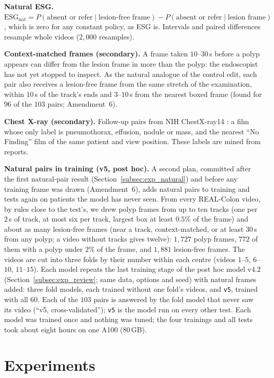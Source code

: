 \documentclass[5p,times,twocolumn,authoryear]{elsarticle}
\begin{document}
\textbf{Natural ESG.} $\text{ESG}_{\text{nat}} = P(\text{absent or refer} \mid \text{lesion-free frame}) - P(\text{absent or refer} \mid \text{lesion frame})$, which is zero for any constant policy, as ESG is. Intervals and paired differences resample whole videos ($2{,}000$ resamples).

\textbf{Context-matched frames (secondary).} A frame taken $10$--$30$\,s before a polyp appears can differ from the lesion frame in more than the polyp: the endoscopist has not yet stopped to inspect. As the natural analogue of the control edit, each pair also receives a lesion-free frame from the same stretch of the examination, within $10$\,s of the track's ends and $3$--$10$\,s from the nearest boxed frame (found for $96$ of the $103$ pairs; Amendment~6).

\textbf{Chest X-ray (secondary).} Follow-up pairs from NIH ChestX-ray14 \citep{wang2017chestx}: a film whose only label is pneumothorax, effusion, nodule or mass, and the nearest ``No Finding'' film of the same patient and view position. These labels are mined from reports.

\textbf{Natural pairs in training (v5, post hoc).} A second plan, committed after the first natural-pair result (Section~\ref{subsec:exp_natural}) and before any training frame was drawn (Amendment~6), adds natural pairs to training and tests again on patients the model has never seen. From every REAL-Colon video, by rules close to the test's, we drew polyp frames from up to ten tracks (one per $2$\,s of track, at most six per track, largest box at least $0.5\%$ of the frame) and about as many lesion-free frames (near a track, context-matched, or at least $30$\,s from any polyp; a video without tracks gives twelve): $1{,}727$ polyp frames, $772$ of them with a polyp under $2\%$ of the frame, and $1{,}881$ lesion-free frames. The videos are cut into three folds by their number within each centre (videos $1$--$5$, $6$--$10$, $11$--$15$). Each model repeats the last training stage of the post hoc model v4.2 (Section~\ref{subsec:exp_review}; same data, options and seed) with natural frames added: three fold models, each trained without one fold's videos, and \texttt{v5}, trained with all $60$. Each of the $103$ pairs is answered by the fold model that never saw its video (``v5, cross-validated''); \texttt{v5} is the model run on every other test. Each model was trained once and nothing was tuned; the four trainings and all tests took about eight hours on one A100 (80\,GB).

\section{Experiments}
\label{sec:experiments}
\end{document}
